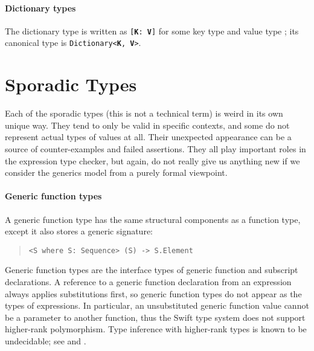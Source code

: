 \documentclass[../generics]{subfiles}
\begin{document}
\paragraph{Dictionary types} The dictionary type is written as \texttt{[\textbf{K}: \textbf{V}]} for some key type  and value type ; its canonical type is \texttt{Dictionary<\textbf{K}, \textbf{V}>}.

\section{Sporadic Types}\label{misc types}

Each of the sporadic types (this is not a technical term) is weird in its own unique way. They tend to only be valid in specific contexts, and some do not represent actual types of values at all. Their unexpected appearance can be a source of counter-examples and failed assertions. They all play important roles in the expression type checker, but again, do not really give us anything new if we consider the generics model from a purely formal viewpoint.

\paragraph{Generic function types}
A generic function type has the same structural components as a function type, except it also stores a generic signature:
\begin{quote}
\begin{verbatim}
<S where S: Sequence> (S) -> S.Element
\end{verbatim}
\end{quote}

Generic function types are the interface types of generic function and subscript declarations. A reference to a generic function declaration from an expression always applies substitutions first, so generic function types do not appear as the types of expressions. In particular, an unsubstituted generic function value cannot be a parameter to another function, thus the Swift type system does not support higher-rank polymorphism. Type inference with higher-rank types is known to be undecidable; see \cite{wells} and \cite{practicalhigherrank}.
\end{document}
